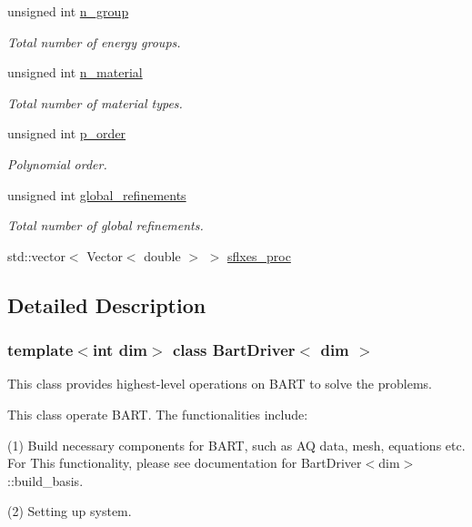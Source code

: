 \begin{DoxyCompactItemize}
unsigned int \hyperlink{class_bart_driver_aeb5a04392c80b32379b02e18acbc1126}{n\+\_\+group}
\begin{DoxyCompactList}\small\item\em Total number of energy groups. \end{DoxyCompactList}\item 
unsigned int \hyperlink{class_bart_driver_ae6c9141662b95c89b674ccdc04e9233f}{n\+\_\+material}
\begin{DoxyCompactList}\small\item\em Total number of material types. \end{DoxyCompactList}\item 
unsigned int \hyperlink{class_bart_driver_ae6d782d30c28d741bb0df46251087809}{p\+\_\+order}
\begin{DoxyCompactList}\small\item\em Polynomial order. \end{DoxyCompactList}\item 
unsigned int \hyperlink{class_bart_driver_a1ddb881c78ef92c59f2c686b320c970e}{global\+\_\+refinements}
\begin{DoxyCompactList}\small\item\em Total number of global refinements. \end{DoxyCompactList}\item 
std\+::vector$<$ Vector$<$ double $>$ $>$ \hyperlink{class_bart_driver_a560ae94f3801fb64a35fdbcd0d8a772d}{sflxes\+\_\+proc}
\end{DoxyCompactItemize}


\subsection{Detailed Description}
\subsubsection*{template$<$int dim$>$\newline
class Bart\+Driver$<$ dim $>$}

This class provides highest-\/level operations on B\+A\+RT to solve the problems. 

This class operate B\+A\+RT. The functionalities include\+:

(1) Build necessary components for B\+A\+RT, such as AQ data, mesh, equations etc. For This functionality, please see documentation for Bart\+Driver$<$dim$>$\+::build\+\_\+basis.

(2) Setting up system.


